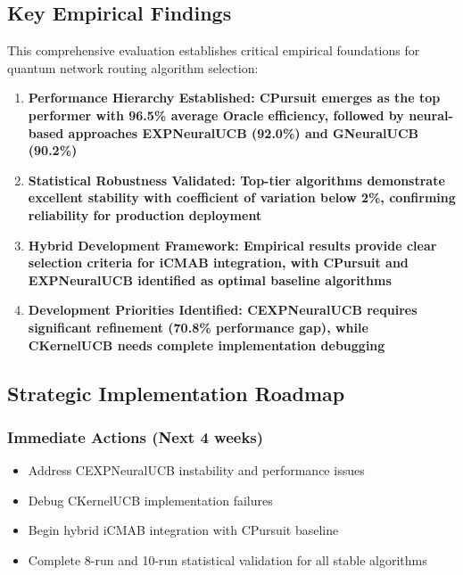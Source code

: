 \documentclass[12pt,a4paper]{article}
\newcommand{\critical}[1]{\textcolor{criticalcolor}{\textbf{#1}}}
\newcommand{\success}[1]{\textcolor{successcolor}{\textbf{#1}}}
\newcommand{\hybrid}[1]{\textcolor{hybridcolor}{\textbf{#1}}}
\begin{document}
\subsection{Key Empirical Findings}

This comprehensive evaluation establishes critical empirical foundations for quantum network routing algorithm selection:

\begin{enumerate}
\item \success{\textbf{Performance Hierarchy Established}: CPursuit emerges as the top performer with 96.5\% average Oracle efficiency, followed by neural-based approaches EXPNeuralUCB (92.0\%) and GNeuralUCB (90.2\%)}

\item \success{\textbf{Statistical Robustness Validated}: Top-tier algorithms demonstrate excellent stability with coefficient of variation below 2\%, confirming reliability for production deployment}

\item \hybrid{\textbf{Hybrid Development Framework}: Empirical results provide clear selection criteria for iCMAB integration, with CPursuit and EXPNeuralUCB identified as optimal baseline algorithms}

\item \critical{\textbf{Development Priorities Identified}: CEXPNeuralUCB requires significant refinement (70.8\% performance gap), while CKernelUCB needs complete implementation debugging}
\end{enumerate}

\subsection{Strategic Implementation Roadmap}

\subsubsection{Immediate Actions (Next 4 weeks)}
\begin{itemize}
\item Address CEXPNeuralUCB instability and performance issues
\item Debug CKernelUCB implementation failures
\item Begin hybrid iCMAB integration with CPursuit baseline
\item Complete 8-run and 10-run statistical validation for all stable algorithms
\end{itemize}
\end{document}
